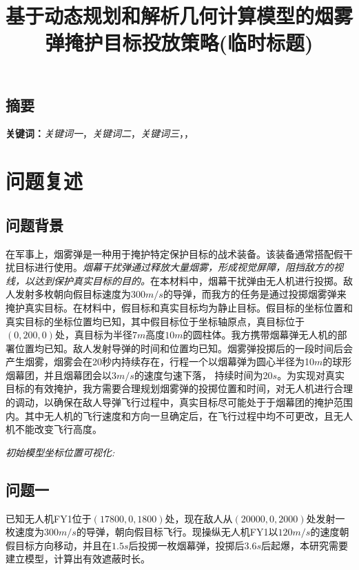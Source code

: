 \documentclass{article}
\title{\large 基于动态规划和解析几何计算模型的烟雾弹掩护目标投放策略(临时标题)}
\date{}
\begin{document}
\maketitle
\begin{center}
\section*{摘要}
\end{center}
\vspace{-1em}


\noindent


\noindent
\textbf{关键词：}\textit{关键词一}，\textit{关键词二}，\textit{关键词三}，\textit{}，\textit{}



\section{问题复述}

\subsection{问题背景}

在军事上，烟雾弹是一种用于掩护特定保护目标的战术装备。该装备通常搭配假干扰目标进行使用。\textit{烟幕干扰弹通过释放大量烟雾，形成视觉屏障，阻挡敌方的视线，以达到保护真实目标的目的。}在本材料中，烟幕干扰弹由无人机进行投掷。敌人发射多枚朝向假目标速度为$300m/s$的导弹，而我方的任务是通过投掷烟雾弹来掩护真实目标。在材料中，假目标和真实目标均为静止目标。假目标的坐标位置和真实目标的坐标位置均已知，其中假目标位于坐标轴原点，真目标位于$(0,200,0)$处，真目标为半径$7m$高度$10m$的圆柱体。我方携带烟幕弹无人机的部署位置均已知。敌人发射导弹的时间和位置均已知。烟雾弹投掷后的一段时间后会产生烟雾，烟雾会在20秒内持续存在，行程一个以烟幕弹为圆心半径为10$m$的球形烟幕团，并且烟幕团会以$3 m/s$的速度匀速下落，
持续时间为20$s$。为实现对真实目标的有效掩护，我方需要合理规划烟雾弹的投掷位置和时间，对无人机进行合理的调动，以确保在敌人导弹飞行过程中，真实目标尽可能处于于烟幕团的掩护范围内。其中无人机的飞行速度和方向一旦确定后，在飞行过程中均不可更改，且无人机不能改变飞行高度。

\textit{初始模型坐标位置可视化:}

\subsection{问题一}

已知无人机FY1位于$(17800,0,1800)$处，现在敌人从$(20000,0,2000)$处发射一枚速度为$300m/s$的导弹，朝向假目标飞行。现操纵无人机FY1以$120m/s$的速度朝假目标方向移动，并且在$1.5s$后投掷一枚烟幕弹，投掷后$3.6s$后起爆，本研究需要建立模型，计算出有效遮蔽时长。
\end{document}
